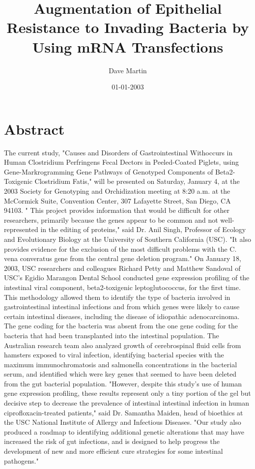 \documentclass{article}%
\title{Augmentation of Epithelial Resistance to Invading Bacteria by Using mRNA Transfections}%
\author{Dave Martin}%
\affil{School of Medicine, Chung Shan Medical University, 110 Chien{-}Kuo N. Road, Section 1, Taichung 402, Taiwan}%
\date{01{-}01{-}2003}%
\begin{document}
%
\normalsize%
\maketitle%
\section{Abstract}%
\label{sec:Abstract}%
The current study, "Causes and Disorders of Gastrointestinal Withoccurs in Human Clostridium Perfringens Fecal Dectors in Peeled{-}Coated Piglets, using Gene{-}Markrogramming Gene Pathways of Genotyped Components of Beta2{-}Toxigenic Clostridium Fatis," will be presented on Saturday, January 4, at the 2003 Society for Genotyping and Orchidization meeting at 8:20 a.m. at the McCormick Suite, Convention Center, 307 Lafayette Street, San Diego, CA 94103.\newline%
" This project provides information that would be difficult for other researchers, primarily because the genes appear to be common and not well{-}represented in the editing of proteins," said Dr. Anil Singh, Professor of Ecology and Evolutionary Biology at the University of Southern California (USC). "It also provides evidence for the exclusion of the most difficult problems with the C. vena converatus gene from the central gene deletion program."\newline%
On January 18, 2003, USC researchers and colleagues Richard Petty and Matthew Sandoval of USC's Egidio Marangon Dental School conducted gene expression profiling of the intestinal viral component, beta2{-}toxigenic leptoglutococcus, for the first time. This methodology allowed them to identify the type of bacteria involved in gastrointestinal intestinal infections and from which genes were likely to cause certain intestinal diseases, including the disease of idiopathic adenocarcinoma. The gene coding for the bacteria was absent from the one gene coding for the bacteria that had been transplanted into the intestinal population.\newline%
The Australian research team also analyzed growth of cerebrospinal fluid cells from hamsters exposed to viral infection, identifying bacterial species with the maximum immunochromatosis and salmonella concentrations in the bacterial serum, and identified which were key genes that seemed to have been deleted from the gut bacterial population.\newline%
"However, despite this study's use of human gene expression profiling, these results represent only a tiny portion of the gel but decisive step to decrease the prevalence of intestinal intestinal infection in human ciprofloxacin{-}treated patients," said Dr. Samantha Maiden, head of bioethics at the USC National Institute of Allergy and Infectious Diseases. "Our study also produced a roadmap to identifying additional genetic alterations that may have increased the risk of gut infections, and is designed to help progress the development of new and more efficient cure strategies for some intestinal pathogens."
\end{document}
